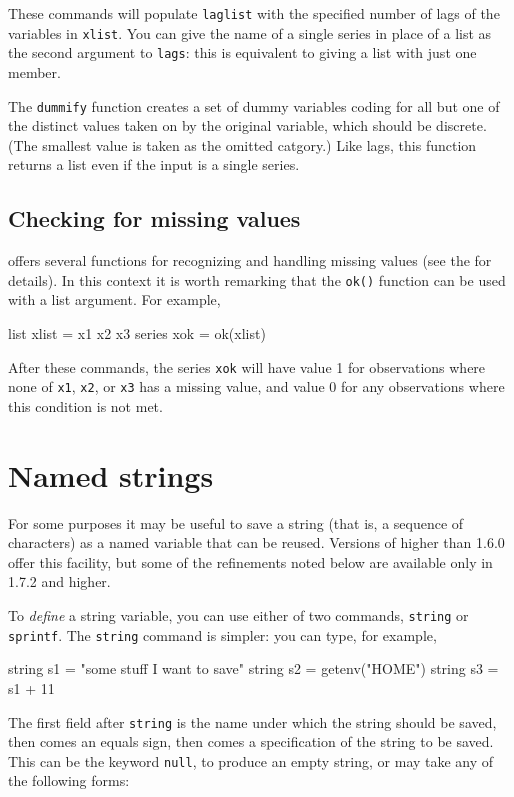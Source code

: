 These commands will populate \texttt{laglist} with the specified
number of lags of the variables in \texttt{xlist}.  You can give the
name of a single series in place of a list as the second argument to
\texttt{lags}: this is equivalent to giving a list with just one
member.

The \texttt{dummify} function creates a set of dummy variables coding
for all but one of the distinct values taken on by the original
variable, which should be discrete.  (The smallest value is taken as
the omitted catgory.)  Like lags, this function returns a list even if
the input is a single series.


\subsection{Checking for missing values}

 offers several functions for recognizing and handling
missing values (see the \GCR{} for details). In this context it is
worth remarking that the \texttt{ok()} function can be used with a
list argument.  For example,
%
\begin{code}
list xlist = x1 x2 x3
series xok = ok(xlist)
\end{code}
%
After these commands, the series \texttt{xok} will have value 1 for
observations where none of \texttt{x1}, \texttt{x2}, or
\texttt{x3} has a missing value, and value 0 for any observations
where this condition is not met.


\section{Named strings}
\label{named-strings}

For some purposes it may be useful to save a string (that is, a
sequence of characters) as a named variable that can be reused.
Versions of  higher than 1.6.0 offer this facility, but
some of the refinements noted below are available only in 
1.7.2 and higher.

To \textit{define} a string variable, you can use either of two
commands, \texttt{string} or \texttt{sprintf}.  The \texttt{string}
command is simpler: you can type, for example,
%
\begin{code}
string s1 = "some stuff I want to save"
string s2 = getenv("HOME")
string s3 = s1 + 11
\end{code}
%
The first field after \texttt{string} is the name under which the
string should be saved, then comes an equals sign, then comes a
specification of the string to be saved. This can be the keyword
\texttt{null}, to produce an empty string, or may take any of the 
following forms:


